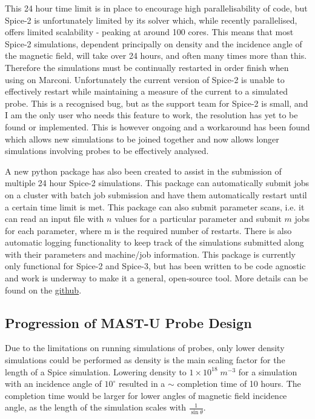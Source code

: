 \documentclass[a4paper, 12pt]{article} %
\begin{document}
    This 24 hour time limit is in place to encourage high parallelisability of code, but Spice-2 is unfortunately limited by its solver which, while recently parallelised, offers limited scalability - peaking at around 100 cores.
    This means that most Spice-2 simulations, dependent principally on density and the incidence angle of the magnetic field, will take over 24 hours, and often many times more than this. 
    Therefore the simulations must be continually restarted in order finish when using on Marconi. 
    Unfortunately the current version of Spice-2 is unable to effectively restart while maintaining a measure of the current to a simulated probe. 
    This is a recognised bug, but as the support team for Spice-2 is small, and I am the only user who needs this feature to work, the resolution has yet to be found or implemented.
    This is however ongoing and a workaround has been found which allows new simulations to be joined together and now allows longer simulations involving probes to be effectively analysed. 
    
    A new python package has also been created to assist in the submission of multiple 24 hour Spice-2 simulations.
    This package can automatically submit jobs on a cluster with batch job submission and have them automatically restart until a certain time limit is met. 
    This package can also submit parameter scans, i.e. it can read an input file with $n$ values for a particular parameter and submit $m$ jobs for each parameter, where m is the required number of restarts.
    There is also automatic logging functionality to keep track of the simulations submitted along with their parameters and machine/job information. 
    This package is currently only functional for Spice-2 and Spice-3, but has been written to be code agnostic and work is underway to make it a general, open-source tool. 
    More details can be found on the \hyperlink{https://github.com/jackleland/autospice/tree/development}{github}.
	
\subsection{\label{subsec:mastu_probe_design} Progression of MAST-U Probe Design}
	Due to the limitations on running simulations of probes, only lower density simulations could be performed as density is the main scaling factor for the length of a Spice simulation.
	Lowering density to $1 \times 10^{18} \; m^{-3}$ for a simulation with an incidence angle of $10^{\circ}$ resulted in a $\sim$ completion time of 10 hours.
	The completion time would be larger for lower angles of magnetic field incidence angle, as the length of the simulation scales with $\frac{1}{\sin{\theta}}$. 
	
\end{document}
